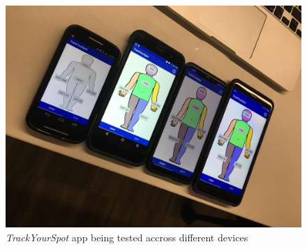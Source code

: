\begin{figure}
    \includegraphics[width=1\textwidth, center]{figures/4devicestesting.jpg}
    \caption{\emph{TrackYourSpot} app being tested accross different devices}
    \label{fig:4devicestesting}
\end{figure}

